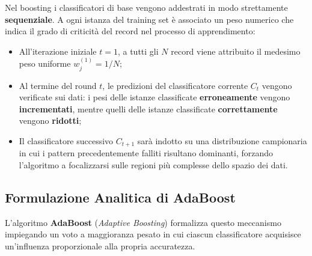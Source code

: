 Nel boosting i classificatori di base vengono addestrati in modo strettamente \textbf{sequenziale}. A ogni istanza del training set è associato un peso numerico che indica il grado di criticità del record nel processo di apprendimento:
\begin{itemize}
    \item All'iterazione iniziale $t = 1$, a tutti gli $N$ record viene attribuito il medesimo peso uniforme $w_j^{(1)} = 1/N$;
    \item Al termine del round $t$, le predizioni del classificatore corrente $C_t$ vengono verificate sui dati: i pesi delle istanze classificate \textbf{erroneamente} vengono \textbf{incrementati}, mentre quelli delle istanze classificate \textbf{correttamente} vengono \textbf{ridotti};
    \item Il classificatore successivo $C_{t+1}$ sarà indotto su una distribuzione campionaria in cui i pattern precedentemente falliti risultano dominanti, forzando l'algoritmo a focalizzarsi sulle regioni più complesse dello spazio dei dati.
\end{itemize}

\FloatBarrier
\subsection{Formulazione Analitica di AdaBoost}
\label{subsec:dm-adaboost-algorithm}

L'algoritmo \textbf{AdaBoost} (\textit{Adaptive Boosting}) formalizza questo meccanismo impiegando un voto a maggioranza pesato in cui ciascun classificatore acquisisce un'influenza proporzionale alla propria accuratezza.

